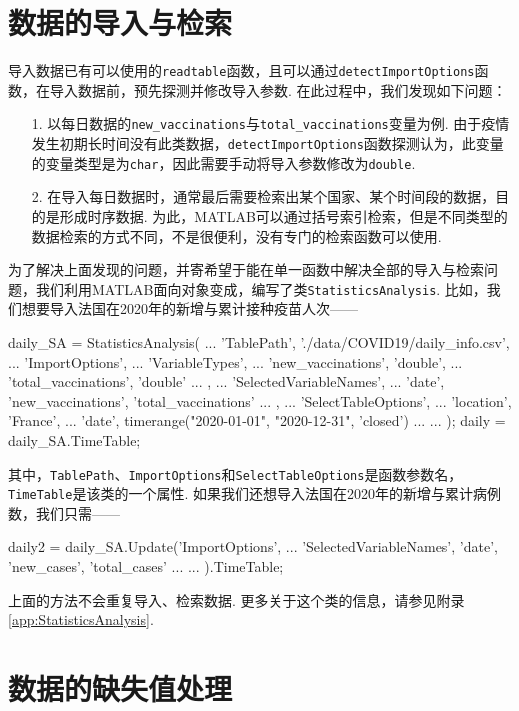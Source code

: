 \documentclass[a4paper, titlepage]{article}
\begin{document}
    \section{数据的导入与检索}\label{数据的导入}
        导入数据已有可以使用的\texttt{readtable}函数，且可以通过\texttt{detectImportOptions}函数，在导入数据前，预先探测并修改导入参数. 在此过程中，我们发现如下问题：
        \begin{enumerate}
            \item [1.] 以每日数据的\texttt{new\_vaccinations}与\texttt{total\_vaccinations}变量为例. 由于疫情发生初期长时间没有此类数据，\texttt{detectImportOptions}函数探测认为，此变量的变量类型是为\texttt{char}，因此需要手动将导入参数修改为\texttt{double}.
            \item [2.] 在导入每日数据时，通常最后需要检索出某个国家、某个时间段的数据，目的是形成时序数据. 为此，MATLAB可以通过括号索引检索，但是不同类型的数据检索的方式不同，不是很便利，没有专门的检索函数可以使用.
        \end{enumerate}
        为了解决上面发现的问题，并寄希望于能在单一函数中解决全部的导入与检索问题，我们利用MATLAB面向对象变成，编写了类\texttt{StatisticsAnalysis}. 比如，我们想要导入法国在2020年的新增与累计接种疫苗人次——
\begin{matlabcode}
daily_SA = StatisticsAnalysis( ...
    'TablePath', './data/COVID19/daily_info.csv', ...
    'ImportOptions', { ...
        'VariableTypes', { ...
            'new_vaccinations', 'double', ...
            'total_vaccinations', 'double' ...
            }, ...
        'SelectedVariableNames', ...
            {'date', 'new_vaccinations', 'total_vaccinations'} ...
        }, ...
    'SelectTableOptions', { ...
        'location', 'France', ...
        'date', timerange("2020-01-01", "2020-12-31", 'closed') ...
        } ...
    );
daily = daily_SA.TimeTable;
\end{matlabcode}
        其中，\texttt{TablePath}、\texttt{ImportOptions}和\texttt{SelectTableOptions}是函数参数名，\texttt{TimeTable}是该类的一个属性. 如果我们还想导入法国在2020年的新增与累计病例数，我们只需——
\begin{matlabcode}
daily2 = daily_SA.Update('ImportOptions', { ...
        'SelectedVariableNames', {'date', 'new_cases', 'total_cases'} ...
        }...
    ).TimeTable;
\end{matlabcode}
        上面的方法不会重复导入、检索数据. 更多关于这个类的信息，请参见附录\ref{app:StatisticsAnalysis}. 

    \newpage
    \section{数据的缺失值处理}\label{数据的缺失值处理}
\end{document}
